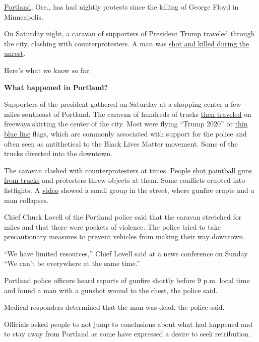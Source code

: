 \href{https://www.nytimes3xbfgragh.onion/2020/09/03/us/michael-reinoehl-arrest-portland-shooting.html}{Portland},
Ore., has had nightly protests since the killing of George Floyd in
Minneapolis.

On Saturday night, a caravan of supporters of President Trump traveled
through the city, clashing with counterprotesters. A man was
\href{https://www.nytimes3xbfgragh.onion/2020/09/04/us/michael-forest-reinoehl-portland.html}{shot
and killed during the unrest}.

Here's what we know so far.

\textbf{What happened in Portland?}

Supporters of the president gathered on Saturday at a shopping center a
few miles southeast of Portland. The caravan of hundreds of trucks
\href{https://www.youtube.com/watch?v=9FvCW_nesXs}{then traveled} on
freeways skirting the center of the city. Most were flying ``Trump
2020'' or
\href{https://www.themarshallproject.org/2020/06/08/the-short-fraught-history-of-the-thin-blue-line-american-flag}{thin
blue line} flags, which are commonly associated with support for the
police and often seen as antithetical to the Black Lives Matter
movement. Some of the trucks diverted into the downtown.

The caravan clashed with counterprotesters at times.
\href{https://www.nytimes3xbfgragh.onion/2020/08/30/us/portland-trump-rally-shooting.html?action=click\&module=Top\%20Stories\&pgtype=Homepage}{People
shot paintball guns from trucks} and protesters threw objects at them.
Some conflicts erupted into fistfights. A
\href{https://twitter.com/stillgray/status/1299932147973677057?s=20}{video}
showed a small group in the street, where gunfire erupts and a man
collapses.

Chief Chuck Lovell of the Portland police said that the caravan
stretched for miles and that there were pockets of violence. The police
tried to take precautionary measures to prevent vehicles from making
their way downtown.

``We have limited resources,'' Chief Lovell said at a news conference on
Sunday. ``We can't be everywhere at the same time.''

Portland police officers heard reports of gunfire shortly before 9 p.m.
local time and found a man with a gunshot wound to the chest, the police
said.

Medical responders determined that the man was dead, the police said.

Officials asked people to not jump to conclusions about what had
happened and to stay away from Portland as some have expressed a desire
to seek retribution.

